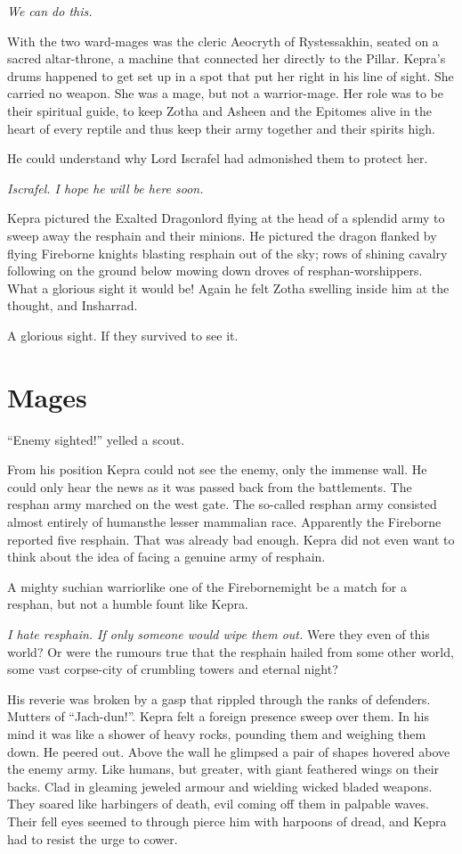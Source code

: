 \documentclass
  [a4paper,
   12pt,
   oneside
  ]%
  {article}
\begin{document}
\emph{We can do this.}

With the two ward-mages was the cleric Aeocryth of Rystessakhin, seated on a sacred altar-throne, a machine that connected her directly to the Pillar. 
Kepra's drums happened to get set up in a spot that put her right in his line of sight. 
She carried no weapon. 
She was a mage, but not a warrior-mage. 
Her role was to be their spiritual guide, to keep Zotha and Asheen and the Epitomes alive in the heart of every reptile and thus keep their army together and their spirits high. 

He could understand why Lord Iscrafel had admonished them to protect her.

\emph{Iscrafel. I hope he will be here soon.} 

Kepra pictured the Exalted Dragonlord flying at the head of a splendid army to sweep away the resphain and their minions. He pictured the dragon flanked by flying Fireborne knights blasting resphain out of the sky; rows of shining cavalry following on the ground below mowing down droves of resphan-worshippers. 
What a glorious sight it would be! Again he felt Zotha swelling inside him at the thought, and Insharrad. 

A glorious sight. If they survived to see it.



\section{Mages}
``Enemy sighted!'' yelled a scout.

From his position Kepra could not see the enemy, only the immense wall. He could only hear the news as it was passed back from the battlements. 
The resphan army marched on the west gate. 
The so-called resphan army consisted almost entirely of humans\dash{}the lesser mammalian race. 
Apparently the Fireborne reported five resphain. That was already bad enough. Kepra did not even want to think about the idea of facing a genuine army of resphain. 

A mighty suchian warrior\dash{}like one of the Fireborne\dash{}might be a match for a resphan, but not a humble fount like Kepra. 

\emph{I hate resphain. If only someone would wipe them out.} Were they even of this world? Or were the rumours true that the resphain hailed from some other world, some vast corpse-city of crumbling towers and eternal night?

His reverie was broken by a gasp that rippled through the ranks of defenders. 
Mutters of ``Jach-dun!''. 
Kepra felt a foreign presence sweep over them.
In his mind it was like a shower of heavy rocks, pounding them and weighing them down. 
He peered out. 
Above the wall he glimpsed a pair of shapes hovered above the enemy army.
Like humans, but greater, with giant feathered wings on their backs. 
Clad in gleaming jeweled armour and wielding wicked bladed weapons. 
They soared like harbingers of death, evil coming off them in palpable waves. 
Their fell eyes seemed to through pierce him with harpoons of dread, and Kepra had to resist the urge to cower. 
\end{document}
